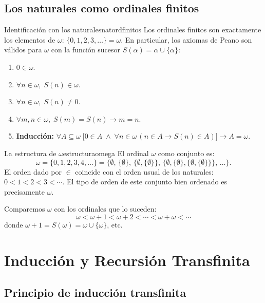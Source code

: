 \subsection{Los naturales como ordinales finitos}

\begin{proposicion}{Identificación con los naturales}{natordfinitos}
Los ordinales finitos son exactamente los elementos de $\omega$: $\{0, 1, 2, 3, \ldots\} = \omega$. En particular, los axiomas de Peano son válidos para $\omega$ con la función sucesor $S(\alpha) = \alpha \cup \{\alpha\}$:
\begin{enumerate}[leftmargin=2em, label=(\roman*)]
  \item $0 \in \omega$.
  \item $\forall n \in \omega,\; S(n) \in \omega$.
  \item $\forall n \in \omega,\; S(n) \neq 0$.
  \item $\forall m, n \in \omega,\; S(m) = S(n) \to m = n$.
  \item \textbf{Inducción:} $\forall A \subseteq \omega\;\bigl[0 \in A \;\wedge\; \forall n \in \omega\,(n \in A \to S(n) \in A)\bigr] \to A = \omega$.
\end{enumerate}
\end{proposicion}

\begin{ejemplo}{La estructura de $\omega$}{estructuraomega}
El ordinal $\omega$ como conjunto es:
\[
  \omega = \{0, 1, 2, 3, 4, \ldots\} = \bigl\{\emptyset,\, \{\emptyset\},\, \{\emptyset,\{\emptyset\}\},\, \{\emptyset,\{\emptyset\},\{\emptyset,\{\emptyset\}\}\},\, \ldots\bigr\}.
\]
El orden dado por $\in$ coincide con el orden usual de los naturales: $0 < 1 < 2 < 3 < \cdots$. El tipo de orden de este conjunto bien ordenado es precisamente $\omega$.

Comparemos $\omega$ con los ordinales que lo suceden:
\[
  \omega < \omega+1 < \omega+2 < \cdots < \omega+\omega < \cdots
\]
donde $\omega + 1 = S(\omega) = \omega \cup \{\omega\}$, etc.
\end{ejemplo}

\section{Inducción y Recursión Transfinita}

\subsection{Principio de inducción transfinita}

